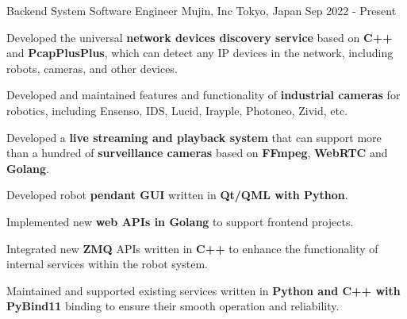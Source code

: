 
\vspace{-2mm}

\begin{cventries}

  \cventry
    {Backend System Software Engineer} %
    {Mujin, Inc} %
    {Tokyo, Japan} %
    {Sep 2022 - Present} %
    {
      \begin{cvitems} %
        \item {Developed the universal \textbf{network devices discovery service} based on \textbf{C++} and \textbf{PcapPlusPlus}, which can detect any IP devices in the network, including robots, cameras, and other devices.}
        \item {Developed and maintained features and functionality of \textbf{industrial cameras} for robotics, including Ensenso, IDS, Lucid, Irayple, Photoneo, Zivid, etc.}
        \item {Developed a \textbf{live streaming and playback system} that can support more than a hundred of \textbf{surveillance cameras} based on \textbf{FFmpeg}, \textbf{WebRTC} and \textbf{Golang}.}
        \item {Developed robot \textbf{pendant GUI} written in \textbf{Qt/QML with Python}.}
        \item {Implemented new \textbf{web APIs in Golang} to support frontend projects.}
        \item {Integrated new \textbf{ZMQ} APIs written in  \textbf{C++} to enhance the functionality of internal services within the robot system.}
        \item {Maintained and supported existing services written in  \textbf{Python and C++ with PyBind11} binding to ensure their smooth operation and reliability.}
      \end{cvitems}
    }

    \vspace{-2mm}


\end{cventries}
